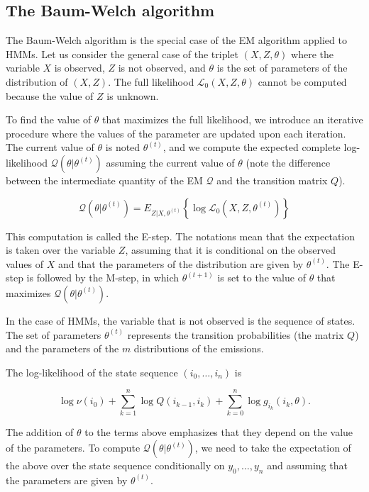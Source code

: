 \documentclass[12pt]{article}
\begin{document}
\subsection{The Baum-Welch algorithm}
\label{sec:Baum-Welch}

    The Baum-Welch algorithm is the special case of the EM algorithm
    applied to HMMs. Let us consider the general case of the triplet
    $(X, Z, \theta)$ where the variable $X$ is observed, $Z$ is not
    observed, and $\theta$ is the set of parameters of the distribution
    of $(X,Z)$. The full likelihood $\mathcal{L}_0(X, Z, \theta)$
    cannot be computed because the value of $Z$ is unknown.

    To find the value of $\theta$ that maximizes the full likelihood,
    we introduce an iterative procedure where the values of the
    parameter are updated upon each iteration. The current value of
    $\theta$ is noted $\theta^{(t)}$, and we compute the expected
    complete log-likelihood $\mathcal{Q}(\theta|\theta^{(t)})$
    assuming the current value of $\theta$ (note the difference
    between the intermediate quantity of the EM $\mathcal{Q}$ and
    the transition matrix $Q$).

    $$ \mathcal{Q}(\theta|\theta^{(t)}) =
      E_{Z|X, \theta^{(t)}} \left\{
      \log \mathcal{L}_0(X, Z, \theta^{(t)}) \right\}$$

    This computation is called the E-step. The notations mean that
    the expectation is taken over the variable $Z$, assuming that
    it is conditional on the observed values of $X$ and that the
    parameters of the distribution are given by $\theta^{(t)}$.
    The E-step is followed by the
    M-step, in which $\theta^{(t+1)}$ is set to the value of
    $\theta$ that maximizes $\mathcal{Q}(\theta|\theta^{(t)})$.

    In the case of HMMs, the variable that is not observed is the
    sequence of states. The set of parameters $\theta^{(t)}$
    represents the transition probabilities (the matrix $Q$)
    and the parameters of the $m$ distributions of the emissions.

    The log-likelihood of the state sequence $(i_0, \ldots, i_n)$
    is

    $$ \log \nu(i_0) + \sum_{k=1}^n \log Q(i_{k-1}, i_k)
      + \sum_{k=0}^n \log g_{i_k}(i_k, \theta). $$

    The addition of $\theta$ to the terms above emphasizes that they
    depend on the value of the parameters. To compute
    $\mathcal{Q}(\theta|\theta^{(t)})$, we need to take the
    expectation of the above over the state sequence
    conditionally on $y_0, \ldots, y_n$ and assuming that the parameters
    are given by $\theta^{(t)}$.
\end{document}
